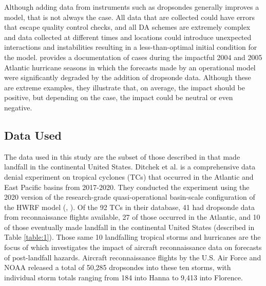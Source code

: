 \documentclass{article}
\begin{document}
Although adding data from instruments such as dropsondes generally improves a model, that is not always the case. All data that are collected could have errors that escape quality control checks, and all DA schemes are extremely complex and data collected at different times and locations could introduce unexpected interactions and instabilities resulting in a less-than-optimal initial condition for the model. \cite{Aberson2008} provides a documentation of cases during the impactful 2004 and 2005 Atlantic hurricane seasons in which the forecasts made by an operational model were significantly degraded by the addition of dropsonde data. Although these are extreme examples, they illustrate that, on average, the impact should be positive, but depending on the case, the impact could be neutral or even negative. 

\subsection{Data Used}

The data used in this study are the subset of those described in \cite{DitchekEA2023} that made landfall in the continental United States. Ditchek et al. is a comprehensive data denial experiment on tropical cyclones (TCs) that occurred in the Atlantic and East Pacific basins from 2017-2020. They conducted the experiment using the 2020 version of the research-grade quasi-operational basin-scale configuration of the HWRF model (\cite{ZhangEA2016}, \cite{AlakaEA2022}).  Of the 92 TCs in their database, 41 had dropsonde data from reconnaissance flights available, 27 of those occurred in the Atlantic, and 10 of those eventually made landfall in the continental United States (described in Table \ref{table:1}). Those same 10 landfalling tropical storms and hurricanes are the focus of \cite{SippelEA2026} which investigates the impact of aircraft reconnaissance data on forecasts of post-landfall hazards. Aircraft reconnaissance flights by the U.S. Air Force and NOAA released a total of 50,285 dropsondes into these ten storms, with individual storm totals ranging from 184 into Hanna to 9,413 into Florence.
\end{document}
